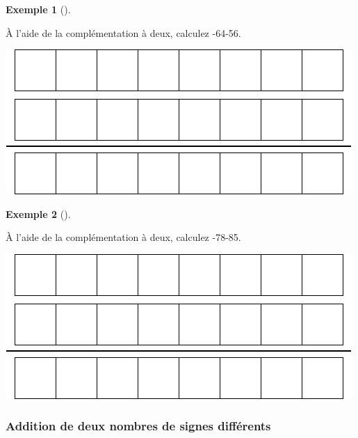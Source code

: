 \documentclass[
  letterpaper,
]{scrbook}
\theoremstyle{definition}
\newtheorem{example}{Exemple}[chapter]
\theoremstyle{definition}
\theoremstyle{plain}
\theoremstyle{remark}
\begin{document}
\leavevmode{}%
\begin{example}[]\label{exm-addition-complement-deux-3}

À l'aide de la complémentation à deux, calculez -64-56.

\includegraphics{./systeme_numeration_files/figure-pdf/unnamed-chunk-10-1.pdf}

\end{example}

\leavevmode{}%
\begin{example}[]\label{exm-addition-complement-deux-4}

À l'aide de la complémentation à deux, calculez -78-85.

\includegraphics{./systeme_numeration_files/figure-pdf/unnamed-chunk-11-1.pdf}

\end{example}

\hypertarget{addition-de-deux-nombres-de-signes-diffuxe9rents}{%
\subsubsection*{Addition de deux nombres de signes
différents}\label{addition-de-deux-nombres-de-signes-diffuxe9rents}}
\end{document}
